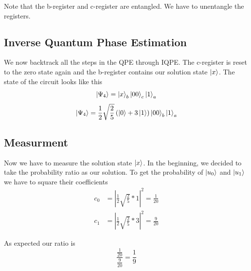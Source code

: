     Note that the b-register and c-register are entangled. We have to unentangle the registers.

\subsection{Inverse Quantum Phase Estimation}
    We now backtrack all the steps in the QPE through IQPE.
    The c-register is reset to the zero state again and the b-register contains our solution state $\ket x$.
    The state of the circuit looks like this
    \begin{equation}
    \ket{\Psi_4}= \ket{x}_b \ket{00}_c \ket{1}_a 
    \end{equation}
    \begin{equation}
    \ket{\Psi_4}=\frac{1}{2}\sqrt{\frac{2}{5}}  \left(\ket{0} +3 \ket{1} \right) \ket{00}_b \ket{1}_a
    \end{equation}

\subsection{Measurment}
    Now we have to measure the solution state $\ket x$.
    In the beginning, we decided to take the probability ratio as our solution. 
    To get the probability of $\ket{u_0}$ and $\ket{u_1}$ we have to square their coefficients
\begin{equation}
\begin{split}
c_0&=\left|\frac{1}{2}\sqrt{\frac{2}{5}}*1\right|^2 = \frac{1}{20}\\
c_1&=\left|\frac{1}{2}\sqrt{\frac{2}{5}}*3\right|^2 = \frac{9}{20}
\end{split}
\end{equation}

As expected our ratio is 
\begin{equation}
 \frac{\frac{1}{20}}{ \frac{9}{20} } = \frac 1 9
\end{equation}


